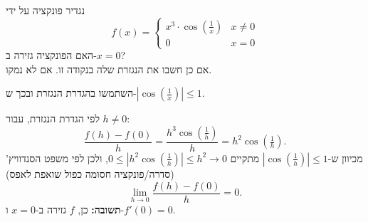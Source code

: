 
\begin{question}
נגדיר פונקציה על ידי
\[ f(x) = \begin{cases} x^3\cdot\cos(\frac1x) & x \neq 0 \\ 0 & x = 0 \end{cases} \]
האם הפונקציה גזירה ב-$x = 0$? \\
אם כן חשבו את הנגזרת שלה בנקודה זו. אם לא נמקו.
\end{question}

\begin{hint}
השתמשו בהגדרת הנגזרת ובכך ש-$|\cos(\frac1x)| \le 1$.
\end{hint}

\begin{solution}
לפי הגדרת הנגזרת, עבור $h \neq 0$:
\[ \frac{f(h) - f(0)}{h} = \frac{h^3\cos(\frac1h)}{h} = h^2\cos\left(\tfrac1h\right). \]
מכיוון ש-$|\cos(\frac1h)| \le 1$ מתקיים $0 \le \left|h^2\cos(\frac1h)\right| \le h^2 \to 0$, ולכן לפי משפט הסנדוויץ' (סדרה/פונקציה חסומה כפול שואפת לאפס)
\[ \lim_{h\to 0}\frac{f(h) - f(0)}{h} = 0. \]
\textbf{תשובה:} כן, $f$ גזירה ב-$x=0$ ו-$f'(0) = 0$.
\end{solution}
